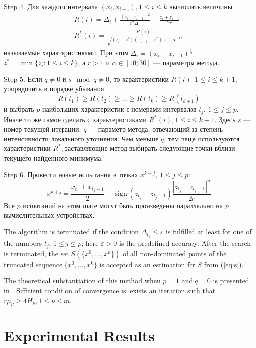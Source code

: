 \documentclass{llncs}
\DeclareMathOperator{\sign}{sign}
\begin{document}
Step 4. Для каждого интервала \((x_i,x_{i-1}),1\leqslant i\leqslant k\) вычислить величины
\begin{eqnarray}
  R(i) = \Delta_i + \frac{(z_i-z_{i-1})^2}{r^2\Delta_i}-\frac{z_i+z_{i-1}}{2r} \\
  R^*(i)=\frac{R(i)}{\sqrt{(z_i-z^*)(z_{i-1}-z^*)} + 1.5^{-\alpha}},
\end{eqnarray}
называемые характеристиками. При этом \(\Delta_i=(x_i-x_{i-1})^\frac{1}{N}\), \(z^*=\min\{z_i:1\leqslant i\leqslant k\}\), а \(r>1\) и \(\alpha\in [10;30]\) --- параметры метода.

Step 5. Если \(q\not=0\) и \(s \mod q\not=0 \), то характеристики \(R(i)\), \(1 \leqslant i \leqslant k + 1\), упорядочить в порядке убывания
\begin{equation*}
  R(t_1) \geqslant R(t_2) \geqslant \dots \geqslant R(t_k) \geqslant R(t_{k+1})
\end{equation*}
и выбрать \(p\) наибольших характеристик с номерами интервалов \(t_j\), \(1 \leqslant j \leqslant p\). Иначе то же самое сделать с характеристиками \(R^*(i),1\leqslant i\leqslant k+1\). Здесь \(s\) --- номер текущей итерации. \(q\) --- параметр метода, отвечающий за степень интенсивности локального уточнения. Чем меньше \(q\), тем чаще используются характеристики \(R^*\), заставляющие метод выбирать следующие точки вблизи текущего найденного минимума.

Step 6. Провести новые испытания в точках \(x^{k+j}\), \(1 \leqslant j \leqslant p\):
\begin{equation}
  x^{k+j}=\frac{x_{t_j}+x_{t_j-1}}{2} - \sign(z_{t_j} - z_{t_j-1})\frac{|z_{t_j} - z_{t_j-1}|^n}{2r}
\end{equation}
Все \(p\) испытаний на этом шаге могут быть произведены параллельно на \(p\) вычислительных устройствах.

The algorithm is terminated if the condition \(\Delta_{t_j}\leqslant \varepsilon\) is fulfilled at least for one of the numbers \(t_j\), \(1\leqslant j\leqslant p\); here \(\varepsilon >0\) is the predefined accuracy.
After the search is terminated, the set \(S(\{x^0,\dots ,x^k\})\) of all
non-dominated points of the truncated sequence \(\{x^0,\dots ,x^k\}\) is accepted as an estimation for \(S\) from (\ref{eq:s}).

The theoretical substantiation of this method when \(p=1\) and \(q=0\) is presented in \cite{}. Siffitient condition of convergence is: exists an iteration such that \(r\mu_\nu \geqslant 4H_\nu,1\leqslant \nu \leqslant m\).
\section{Experimental Results}
\end{document}

